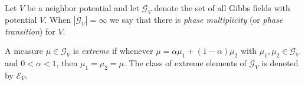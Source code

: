 Let $V$ be a neighbor potential and let $\mathcal{G}_V$ denote the set of all Gibbs fields with potential $V$. When $|\mathcal{G}_V| = \infty$ we say that there is \emph{phase multiplicity} (or \emph{phase transition}) for $V$.

A measure $\mu \in \mathcal{G}_V$ is \emph{extreme} if whenever $\mu = \alpha \mu_1 + (1 - \alpha)\mu_2$ with $\mu_1, \mu_2 \in \mathcal{G}_V$ and $0 < \alpha < 1$, then $\mu_1 = \mu_2 = \mu$. The class of extreme elements of $\mathcal{G}_V$ is denoted by $\mathcal{E}_V$.
